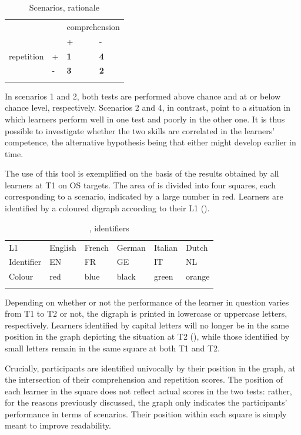 \begin{table}
    \begin{tabularx}{\textwidth}{XXXX} &  & \multicolumn{2}{X}{ comprehension}\\
    \lsptoprule
    &  & + & {}-\\
     repetition & + & \textbf{1} & \textbf{4}\\
    & {}- & \textbf{3} & \textbf{2}\\
    \lspbottomrule
    \end{tabularx}
    \caption{Scenarios, rationale}
    \label{tab:06:2}
\end{table}

In scenarios 1 and 2, both tests are performed above chance and at or below chance level, respectively. Scenarios 2 and 4, in contrast, point to a situation in which learners perform well in one test and poorly in the other one. It is thus possible to investigate whether the two skills are correlated in the learners' competence, the alternative hypothesis being that either might develop earlier in time.

The use of this tool is exemplified on the basis of the results obtained by all learners at T1 on OS targets. The area of  is divided into four squares, each corresponding to a scenario, indicated by a large number in red. Learners are identified by a coloured digraph according to their L1 ().

\begin{table}
    \begin{tabularx}{\textwidth}{XXXXXX}
    \lsptoprule
    L1 & English & French & German & Italian & Dutch\\
    Identifier & EN & FR & GE & IT & NL\\
    Colour & red & blue & black & green & orange\\
    \lspbottomrule
    \end{tabularx}
    \caption{, identifiers}
    \label{tab:06:3}
\end{table}

Depending on whether or not the performance of the learner in question varies from T1 to T2 or not, the digraph is printed in lowercase or uppercase letters, respectively. Learners identified by capital letters will no longer be in the same position in the graph depicting the situation at T2 (), while those identified by small letters remain in the same square at both T1 and T2. 

Crucially, participants are identified univocally by their position in the graph, at the intersection of their comprehension and repetition scores. The position of each learner in the square does not reflect actual scores in the two tests: rather, for the reasons previously discussed, the graph only indicates the participants’ performance in terms of scenarios. Their position within each square is simply meant to improve readability. 


